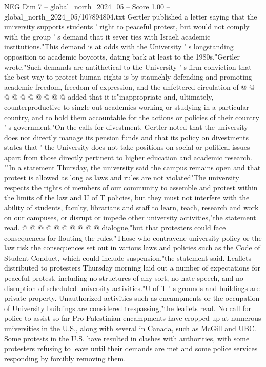 \begin{textsample}{NEG Dim 7 – global\_north\_2024\_05 – Score 1.00 – global\_north\_2024\_05/107894804.txt}
Gertler published a letter saying that the university supports students ' right to peaceful protest, but would not comply with the group ' s demand that it sever ties with Israeli academic institutions."This demand is at odds with the University ' s longstanding opposition to academic boycotts, dating back at least to the 1980s,"Gertler wrote."Such demands are antithetical to the University ' s firm conviction that the best way to protect human rights is by staunchly defending and promoting academic freedom, freedom of expression, and the unfettered circulation of @ @ @ @ @ @ @ @ @ @ added that it is"inappropriate and, ultimately, counterproductive to single out academics working or studying in a particular country, and to hold them accountable for the actions or policies of their country ' s government."On the calls for divestment, Gertler noted that the university does not directly manage its pension funds and that its policy on divestments states that ' the University does not take positions on social or political issues apart from those directly pertinent to higher education and academic research. '"In a statement Thursday, the university said the campus remains open and that protest is allowed as long as laws and rules are not violated"The university respects the rights of members of our community to assemble and protest within the limits of the law and U of T policies, but they must not interfere with the ability of students, faculty, librarians and staff to learn, teach, research and work on our campuses, or disrupt or impede other university activities,"the statement read. @ @ @ @ @ @ @ @ @ @ dialogue,"but that protesters could face consequences for flouting the rules."Those who contravene university policy or the law risk the consequences set out in various laws and policies such as the Code of Student Conduct, which could include suspension,"the statement said.
Leaflets distributed to protesters Thursday morning laid out a number of expectations for peaceful protest, including no structures of any sort, no hate speech, and no disruption of scheduled university activities."U of T ' s grounds and buildings are private property.
Unauthorized activities such as encampments or the occupation of University buildings are considered trespassing,"the leaflets read.
No call for police to assist so far Pro-Palestinian encampments have cropped up at numerous universities in the U.S., along with several in Canada, such as McGill and UBC.
Some protests in the U.S. have resulted in clashes with authorities, with some protesters refusing to leave until their demands are met and some police services responding by forcibly removing them.

\end{textsample}
